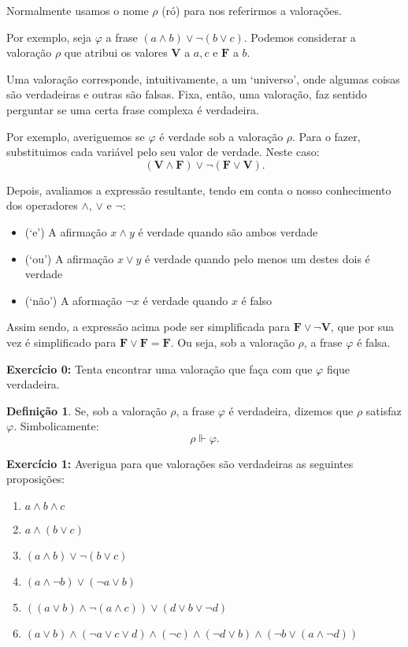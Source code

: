 \documentclass{article}
\theoremstyle{definition}
\newtheorem{definicao}{Definição}
\theoremstyle{remark}
\newcommand{\V}{\mathbf{V}}
\newcommand{\F}{\mathbf{F}}
\begin{document}
	Normalmente usamos o nome $\rho$ (ró) para nos referirmos a valorações.
	
	Por exemplo, seja $\varphi$ a frase $(a \land b) \lor \neg (b \lor c)$. Podemos considerar a valoração $\rho$ que atribui os valores $\V$ a $a, c$ e $\F$ a $b$.
	
	Uma valoração corresponde, intuitivamente, a um `universo', onde algumas coisas são verdadeiras e outras são falsas. Fixa, então, uma valoração, faz sentido perguntar se uma certa frase complexa é verdadeira.
	
	Por exemplo, averiguemos se $\varphi$ é verdade sob a valoração $\rho$. Para o fazer, substituimos cada variável pelo seu valor de verdade. Neste caso:
	\[(\V \land \F) \lor \neg (\F \lor \V).\]
	
	Depois, avaliamos a expressão resultante, tendo em conta o nosso conhecimento dos operadores $\land$, $\lor$ e $\neg$:
	
	\begin{itemize}
	\item (`e') A afirmação $x \land y$ é verdade quando são ambos verdade
	
	\item (`ou') A afirmação $x \lor y$ é verdade quando pelo menos um destes dois é verdade
	
	\item (`não') A aformação $\neg x$ é verdade quando $x$ é falso
	\end{itemize}
	
	Assim sendo, a expressão acima pode ser simplificada para $\F \lor \neg \V$, que por sua vez é simplificado para $\F \lor \F = \F$. Ou seja, sob a valoração $\rho$, a frase $\varphi$ é falsa.
	
	\textbf{Exercício 0:} Tenta encontrar uma valoração que faça com que $\varphi$ fique verdadeira.
	
	\begin{definicao}
	Se, sob a valoração $\rho$, a frase $\varphi$ é verdadeira, dizemos que $\rho$ satisfaz $\varphi$. Simbolicamente:
	\[\rho \Vdash \varphi.\]
	\end{definicao}
	
	\textbf{Exercício 1:} Averigua para que valorações são verdadeiras as seguintes proposições:
	
	\begin{enumerate}
	\item $a \land b \land c$
	
	\item $a \land (b \lor c)$
	
	\item $(a \land b) \lor \neg (b \lor c)$
	
	\item $(a \land \neg b) \lor (\neg a \lor b)$
	
	\item $((a \lor b) \land \neg (a \land c)) \lor (d \lor b \lor \neg d)$
	
	\item $(a \lor b) \land (\neg a \lor c \lor d) \land (\neg c) \land (\neg d \lor b) \land (\neg b \lor (a \land \neg d))$
	\end{enumerate}
	
\end{document}
